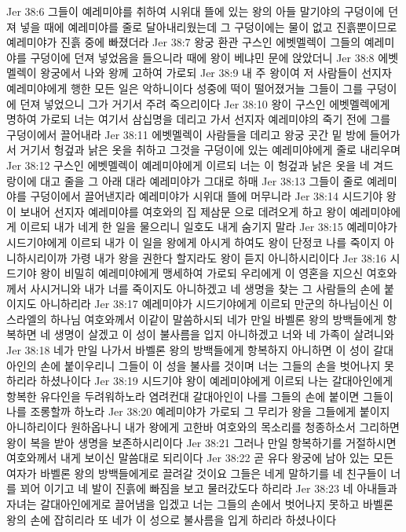 Jer 38:6  그들이 예레미야를 취하여 시위대 뜰에 있는 왕의 아들 말기야의 구덩이에 던져 넣을 때에 예레미야를 줄로 달아내리웠는데 그 구덩이에는 물이 없고 진흙뿐이므로 예레미야가 진흙 중에 빠졌더라
Jer 38:7  왕궁 환관 구스인 에벳멜렉이 그들의 예레미야를 구덩이에 던져 넣었음을 들으니라 때에 왕이 베냐민 문에 앉았더니
Jer 38:8  에벳멜렉이 왕궁에서 나와 왕께 고하여 가로되
Jer 38:9  내 주 왕이여 저 사람들이 선지자 예레미야에게 행한 모든 일은 악하니이다 성중에 떡이 떨어졌거늘 그들이 그를 구덩이에 던져 넣었으니 그가 거기서 주려 죽으리이다
Jer 38:10  왕이 구스인 에벳멜렉에게 명하여 가로되 너는 여기서 삼십명을 데리고 가서 선지자 예레미야의 죽기 전에 그를 구덩이에서 끌어내라
Jer 38:11  에벳멜렉이 사람들을 데리고 왕궁 곳간 밑 방에 들어가서 거기서 헝겊과 낡은 옷을 취하고 그것을 구덩이에 있는 예레미야에게 줄로 내리우며
Jer 38:12  구스인 에벳멜렉이 예레미야에게 이르되 너는 이 헝겊과 낡은 옷을 네 겨드랑이에 대고 줄을 그 아래 대라 예레미야가 그대로 하매
Jer 38:13  그들이 줄로 예레미야를 구덩이에서 끌어낸지라 예레미야가 시위대 뜰에 머무니라
Jer 38:14  시드기야 왕이 보내어 선지자 예레미야를 여호와의 집 제삼문 으로 데려오게 하고 왕이 예레미야에게 이르되 내가 네게 한 일을 물으리니 일호도 내게 숨기지 말라
Jer 38:15  예레미야가 시드기야에게 이르되 내가 이 일을 왕에게 아시게 하여도 왕이 단정코 나를 죽이지 아니하시리이까 가령 내가 왕을 권한다 할지라도 왕이 듣지 아니하시리이다
Jer 38:16  시드기야 왕이 비밀히 예레미야에게 맹세하여 가로되 우리에게 이 영혼을 지으신 여호와께서 사시거니와 내가 너를 죽이지도 아니하겠고 네 생명을 찾는 그 사람들의 손에 붙이지도 아니하리라
Jer 38:17  예레미야가 시드기야에게 이르되 만군의 하나님이신 이스라엘의 하나님 여호와께서 이같이 말씀하시되 네가 만일 바벨론 왕의 방백들에게 항복하면 네 생명이 살겠고 이 성이 불사름을 입지 아니하겠고 너와 네 가족이 살려니와
Jer 38:18  네가 만일 나가서 바벨론 왕의 방백들에게 항복하지 아니하면 이 성이 갈대아인의 손에 붙이우리니 그들이 이 성을 불사를 것이며 너는 그들의 손을 벗어나지 못하리라 하셨나이다
Jer 38:19  시드기야 왕이 예레미야에게 이르되 나는 갈대아인에게 항복한 유다인을 두려워하노라 염려컨대 갈대아인이 나를 그들의 손에 붙이면 그들이 나를 조롱할까 하노라
Jer 38:20  예레미야가 가로되 그 무리가 왕을 그들에게 붙이지 아니하리이다 원하옵나니 내가 왕에게 고한바 여호와의 목소리를 청종하소서 그리하면 왕이 복을 받아 생명을 보존하시리이다
Jer 38:21  그러나 만일 항복하기를 거절하시면 여호와께서 내게 보이신 말씀대로 되리이다
Jer 38:22  곧 유다 왕궁에 남아 있는 모든 여자가 바벨론 왕의 방백들에게로 끌려갈 것이요 그들은 네게 말하기를 네 친구들이 너를 꾀어 이기고 네 발이 진흙에 빠짐을 보고 물러갔도다 하리라
Jer 38:23  네 아내들과 자녀는 갈대아인에게로 끌어냄을 입겠고 너는 그들의 손에서 벗어나지 못하고 바벨론 왕의 손에 잡히리라 또 네가 이 성으로 불사름을 입게 하리라 하셨나이다
